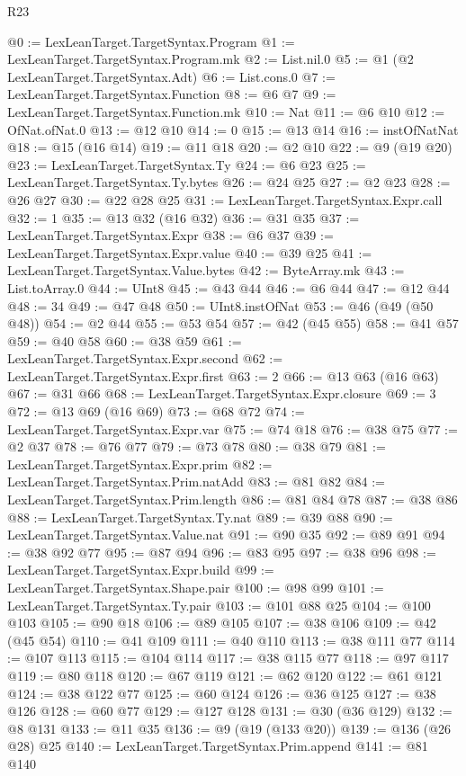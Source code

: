 \begin{lexlean}{R23}
\begin{coremodule}
@0 := LexLeanTarget.TargetSyntax.Program
@1 := LexLeanTarget.TargetSyntax.Program.mk
@2 := List.nil.{0}
@5 := @1 (@2 LexLeanTarget.TargetSyntax.Adt)
@6 := List.cons.{0}
@7 := LexLeanTarget.TargetSyntax.Function
@8 := @6 @7
@9 := LexLeanTarget.TargetSyntax.Function.mk
@10 := Nat
@11 := @6 @10
@12 := OfNat.ofNat.{0}
@13 := @12 @10
@14 := 0
@15 := @13 @14
@16 := instOfNatNat
@18 := @15 (@16 @14)
@19 := @11 @18
@20 := @2 @10
@22 := @9 (@19 @20)
@23 := LexLeanTarget.TargetSyntax.Ty
@24 := @6 @23
@25 := LexLeanTarget.TargetSyntax.Ty.bytes
@26 := @24 @25
@27 := @2 @23
@28 := @26 @27
@30 := @22 @28 @25
@31 := LexLeanTarget.TargetSyntax.Expr.call
@32 := 1
@35 := @13 @32 (@16 @32)
@36 := @31 @35
@37 := LexLeanTarget.TargetSyntax.Expr
@38 := @6 @37
@39 := LexLeanTarget.TargetSyntax.Expr.value
@40 := @39 @25
@41 := LexLeanTarget.TargetSyntax.Value.bytes
@42 := ByteArray.mk
@43 := List.toArray.{0}
@44 := UInt8
@45 := @43 @44
@46 := @6 @44
@47 := @12 @44
@48 := 34
@49 := @47 @48
@50 := UInt8.instOfNat
@53 := @46 (@49 (@50 @48))
@54 := @2 @44
@55 := @53 @54
@57 := @42 (@45 @55)
@58 := @41 @57
@59 := @40 @58
@60 := @38 @59
@61 := LexLeanTarget.TargetSyntax.Expr.second
@62 := LexLeanTarget.TargetSyntax.Expr.first
@63 := 2
@66 := @13 @63 (@16 @63)
@67 := @31 @66
@68 := LexLeanTarget.TargetSyntax.Expr.closure
@69 := 3
@72 := @13 @69 (@16 @69)
@73 := @68 @72
@74 := LexLeanTarget.TargetSyntax.Expr.var
@75 := @74 @18
@76 := @38 @75
@77 := @2 @37
@78 := @76 @77
@79 := @73 @78
@80 := @38 @79
@81 := LexLeanTarget.TargetSyntax.Expr.prim
@82 := LexLeanTarget.TargetSyntax.Prim.natAdd
@83 := @81 @82
@84 := LexLeanTarget.TargetSyntax.Prim.length
@86 := @81 @84 @78
@87 := @38 @86
@88 := LexLeanTarget.TargetSyntax.Ty.nat
@89 := @39 @88
@90 := LexLeanTarget.TargetSyntax.Value.nat
@91 := @90 @35
@92 := @89 @91
@94 := @38 @92 @77
@95 := @87 @94
@96 := @83 @95
@97 := @38 @96
@98 := LexLeanTarget.TargetSyntax.Expr.build
@99 := LexLeanTarget.TargetSyntax.Shape.pair
@100 := @98 @99
@101 := LexLeanTarget.TargetSyntax.Ty.pair
@103 := @101 @88 @25
@104 := @100 @103
@105 := @90 @18
@106 := @89 @105
@107 := @38 @106
@109 := @42 (@45 @54)
@110 := @41 @109
@111 := @40 @110
@113 := @38 @111 @77
@114 := @107 @113
@115 := @104 @114
@117 := @38 @115 @77
@118 := @97 @117
@119 := @80 @118
@120 := @67 @119
@121 := @62 @120
@122 := @61 @121
@124 := @38 @122 @77
@125 := @60 @124
@126 := @36 @125
@127 := @38 @126
@128 := @60 @77
@129 := @127 @128
@131 := @30 (@36 @129)
@132 := @8 @131
@133 := @11 @35
@136 := @9 (@19 (@133 @20))
@139 := @136 (@26 @28) @25
@140 := LexLeanTarget.TargetSyntax.Prim.append
@141 := @81 @140

\end{coremodule}
\end{lexlean}
